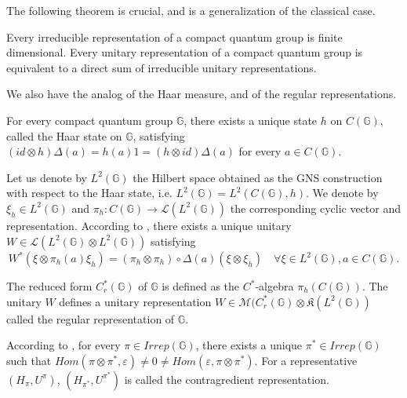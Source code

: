 The following theorem is crucial, and is a generalization of the classical case. 

\begin{thm} Every irreducible representation of a compact quantum group is finite dimensional. Every unitary representation of a compact quantum group is equivalent to a direct sum of irreducible unitary representations. 
\end{thm}
 
We also have the analog of the Haar measure, and of the regular representations.

\begin{prop}
For every compact quantum group $\mathbb G$, there exists a unique state $h$ on $C(\mathbb G)$, called the Haar state on $\mathbb G$, satisfying $(id\otimes h)\Delta(a) = h(a)1 = (h\otimes id)\Delta(a)$ for every $a\in C(\mathbb G)$. 
\end{prop}

Let us denote by $L^2(\mathbb G)$ the Hilbert space obtained as the GNS construction with respect to the Haar state, i.e. $L^2(\mathbb G) = L^2(C(\mathbb G),h)$. We denote by $\xi_h\in L^2(\mathbb G)$ and $\pi_h : C(\mathbb G)\rightarrow \mathcal L(L^2(\mathbb G))$ the corresponding cyclic vector and representation. According to \cite{Wo}, there exists a unique unitary $W\in \mathcal L(L^2(\mathbb G) \otimes L^2(\mathbb G) )$ satisfying 
\[W^*(\xi\otimes \pi_h(a)\xi_h ) = (\pi_h\otimes\pi_h)\circ \Delta(a)(\xi\otimes \xi_h)\quad \forall \xi\in L^2(\mathbb G),a\in C(\mathbb G).\] 

\begin{definition}
The reduced form $C_r^*(\mathbb G)$ of $\mathbb G$ is defined as the $C^*$-algebra $\pi_h(C(\mathbb G))$. The unitary $W$ defines a unitary representation $W\in\mathcal M(C_r^*(\mathbb G)\otimes \mathfrak K(L^2(\mathbb G))$ called the regular representation of $\mathbb G$.
\end{definition}

According to \cite{Wo}, for every $\pi\in Irrep(\mathbb G)$, there exists a unique $\pi^*\in Irrep(\mathbb G)$ such that $Hom(\pi\otimes \pi^*,\varepsilon)\neq 0 \neq Hom(\varepsilon,\pi\otimes \pi^*) $. For a representative $(H_\pi,U^\pi)$, $(H_{\pi^*},U^{\pi^*})$ is called the contragredient representation.\\

